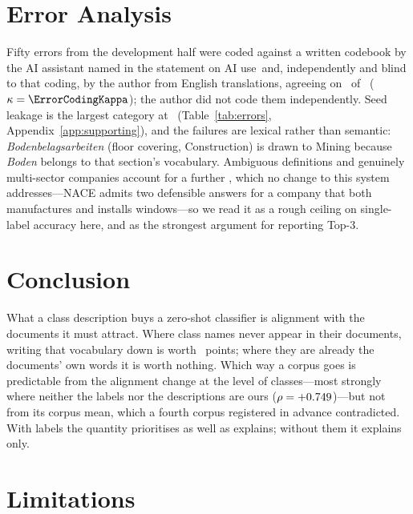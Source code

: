 \documentclass[11pt]{article}
\begin{document}
\section{Error Analysis}

Fifty errors from the development half were coded against a written codebook by
the AI assistant named in the statement on AI use\ifdefined\ErrorCodingKappa\
and, independently and blind to that coding, by the author from English
translations, agreeing on \ErrorCodingAgree\ of \ErrorCodingN\
($\kappa = \ErrorCodingKappa$)\else; the author did not code them
independently\fi. Seed leakage is the largest category at \SeedLeakShare\
(Table~\ref{tab:errors}, Appendix~\ref{app:supporting}), and the failures are
lexical rather than semantic: \emph{Bodenbelagsarbeiten} (floor covering,
Construction) is drawn to Mining because \emph{Boden} belongs to that section's
vocabulary. Ambiguous definitions and genuinely multi-sector companies account
for a further \AmbigMultiShare, which no change to this system addresses---NACE
admits two defensible answers for a company that both manufactures and installs
windows---so we read it as a rough ceiling on single-label accuracy here, and as
the strongest argument for reporting Top-3.

\section{Conclusion}

What a class description buys a zero-shot classifier is alignment with the
documents it must attract. Where class names never appear in their documents,
writing that vocabulary down is worth \ContentEffect~points; where they are
already the documents' own words it is worth nothing. Which way a corpus goes
is predictable from the alignment change at the level of classes---most
strongly where neither the labels nor the descriptions are ours
($\rho = +0.749$)---but not from its corpus mean, which a fourth corpus
registered in advance contradicted. With labels the quantity prioritises as
well as explains; without them it explains only.

\section*{Limitations}
\end{document}
